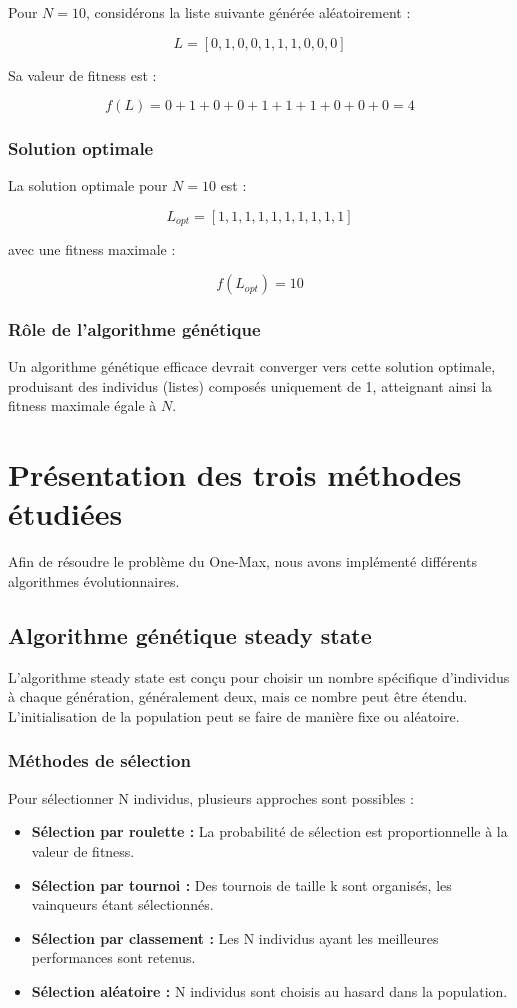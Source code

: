 \documentclass{article}
\begin{document}
Pour $N = 10$, considérons la liste suivante générée aléatoirement :

\[
L = [0, 1, 0, 0, 1, 1, 1, 0, 0, 0]
\]

Sa valeur de fitness est :

\[
f(L) = 0 + 1 + 0 + 0 + 1 + 1 + 1 + 0 + 0 + 0 = 4
\]

\subsubsection{Solution optimale}

La solution optimale pour $N = 10$ est :

\[
L_{opt} = [1, 1, 1, 1, 1, 1, 1, 1, 1, 1]
\]

avec une fitness maximale :

\[
f(L_{opt}) = 10
\]

\subsubsection{Rôle de l'algorithme génétique}

Un algorithme génétique efficace devrait converger vers cette solution optimale, produisant des individus (listes) composés uniquement de 1, atteignant ainsi la fitness maximale égale à $N$.

\section{Présentation des trois méthodes étudiées}
Afin de résoudre le problème du One-Max, nous avons implémenté différents algorithmes évolutionnaires.

\subsection{Algorithme génétique steady state}
L'algorithme steady state est conçu pour choisir un nombre spécifique d'individus à chaque génération, généralement deux, mais ce nombre peut être étendu. L'initialisation de la population peut se faire de manière fixe ou aléatoire.

\subsubsection{Méthodes de sélection}

Pour sélectionner N individus, plusieurs approches sont possibles :

\begin{itemize}
    \item \textbf{Sélection par roulette :} La probabilité de sélection est proportionnelle à la valeur de fitness.
    \item \textbf{Sélection par tournoi :} Des tournois de taille k sont organisés, les vainqueurs étant sélectionnés.
    \item \textbf{Sélection par classement :} Les N individus ayant les meilleures performances sont retenus.
    \item \textbf{Sélection aléatoire :} N individus sont choisis au hasard dans la population.
\end{itemize}
\end{document}
